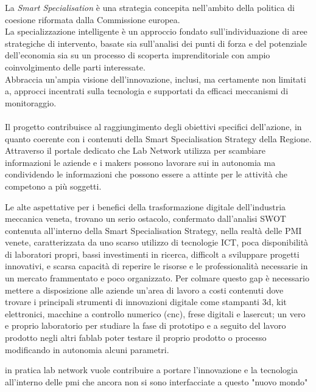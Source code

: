 La \textit{Smart Specialisation} è una strategia concepita nell'ambito della politica di coesione riformata dalla Commissione europea.\\
La specializzazione intelligente è un approccio fondato sull'individuazione di aree strategiche di intervento, basate sia sull'analisi dei punti di forza e del potenziale dell'economia sia su un processo di scoperta imprenditoriale con ampio coinvolgimento delle parti interessate.\\
Abbraccia un'ampia visione dell'innovazione, inclusi, ma certamente non limitati a, approcci incentrati sulla tecnologia e supportati da efficaci meccanismi di monitoraggio.\\
\\
Il progetto contribuisce al raggiungimento degli obiettivi specifici dell'azione, in quanto coerente con i contenuti della Smart Specialisation Strategy della Regione. Attraverso il portale dedicato che Lab Network utilizza per scambiare informazioni le aziende e i makers possono lavorare sui in autonomia ma condividendo le informazioni che possono essere a attinte per le attività che competono a più soggetti.


Le alte aspettative per i benefici della trasformazione digitale dell'industria meccanica veneta, trovano un serio ostacolo, confermato dall'analisi SWOT contenuta all'interno della Smart Specialisation Strategy, nella realtà delle PMI venete, caratterizzata da uno scarso utilizzo di tecnologie ICT, poca disponibilità di laboratori propri, bassi investimenti in ricerca, difficolt a sviluppare progetti innovativi, e scarsa capacità di reperire le risorse e le professionalità necessarie in un mercato frammentato e poco organizzato.
Per colmare questo gap è necessario mettere a disposizione alle aziende un'area di lavoro a costi contenuti dove trovare i principali strumenti di innovazioni digitale come stampanti 3d, kit elettronici, macchine a controllo numerico (cnc), frese digitali e lasercut; un vero e proprio laboratorio per studiare la fase di prototipo e a seguito del lavoro prodotto negli altri fablab poter testare il proprio prodotto o processo modificando in autonomia alcuni parametri.



in pratica lab network vuole contribuire a portare l'innovazione e la tecnologia all'interno delle pmi che ancora non si sono interfacciate a questo "nuovo mondo"
